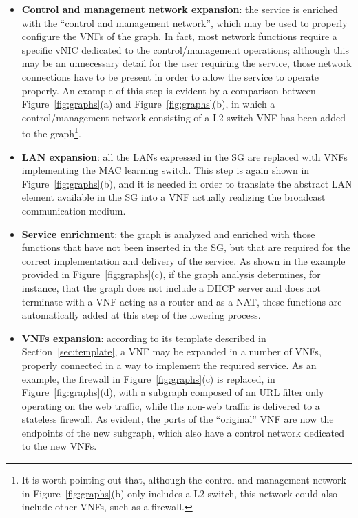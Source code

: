 %
\begin{itemize}
	\item  \textbf{Control and management network expansion}: the service is enriched with the ``control and management network'', which may be used %
	to  properly configure  the VNFs of the graph.
	In fact, most network functions require a specific vNIC dedicated to the control/management operations; although this may be an unnecessary detail for the user requiring the service, those network connections have to be present in order to allow the service to operate properly. 
	An example of this step is evident by a comparison between Figure~\ref{fig:graphs}(a) and  Figure~\ref{fig:graphs}(b), in which a control/management network consisting of a L2 switch VNF has been added to the graph\footnote{It is worth pointing out that, although the control and management network in Figure~\ref{fig:graphs}(b) only includes a L2 switch, this network could also include other VNFs, such as a firewall.}.
	\item \textbf{LAN expansion}: all the LANs expressed in the SG are replaced with VNFs implementing the MAC learning switch.
	This step is again shown in Figure~\ref{fig:graphs}(b), and it is needed in order to translate the abstract LAN element available in the SG into a VNF actually realizing the broadcast communication medium.
	\item \textbf{Service enrichment}: the graph is analyzed and enriched with those functions that have not been inserted in the SG, but that are required for the correct implementation and delivery of the service.
	As shown in the example provided in Figure~\ref{fig:graphs}(c), if the graph analysis determines, for instance, that the graph does not include a DHCP server and does not terminate with a VNF acting as a router and as a NAT,  these functions are automatically added at this step of the lowering process.
	\item \textbf{VNFs expansion}: according to its template described in Section~\ref{sec:template}, a VNF may be expanded in a number of VNFs, properly connected in a way to implement the required service.
	As an example, the firewall in Figure~\ref{fig:graphs}(c) is replaced, in Figure~\ref{fig:graphs}(d), with a subgraph composed of an URL filter only operating on the web traffic, while the non-web traffic is delivered to a stateless firewall.
	As evident, the ports of the ``original'' VNF are now the endpoints of the new subgraph, which also have a control network dedicated to the new VNFs.

\end{itemize}
